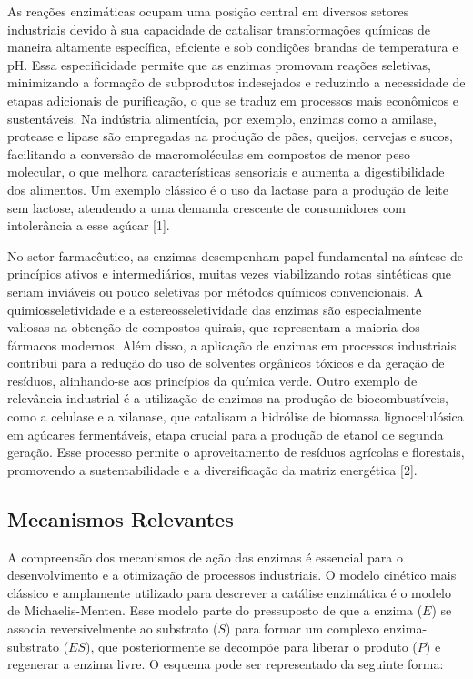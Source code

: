 \documentclass[12pt,oneside]{report}
\begin{document}
As reações enzimáticas ocupam uma posição central em diversos setores industriais devido à sua capacidade de catalisar transformações químicas de maneira altamente específica, eficiente e sob condições brandas de temperatura e pH. Essa especificidade permite que as enzimas promovam reações seletivas, minimizando a formação de subprodutos indesejados e reduzindo a necessidade de etapas adicionais de purificação, o que se traduz em processos mais econômicos e sustentáveis. Na indústria alimentícia, por exemplo, enzimas como a amilase, protease e lipase são empregadas na produção de pães, queijos, cervejas e sucos, facilitando a conversão de macromoléculas em compostos de menor peso molecular, o que melhora características sensoriais e aumenta a digestibilidade dos alimentos. Um exemplo clássico é o uso da lactase para a produção de leite sem lactose, atendendo a uma demanda crescente de consumidores com intolerância a esse açúcar [1].

No setor farmacêutico, as enzimas desempenham papel fundamental na síntese de princípios ativos e intermediários, muitas vezes viabilizando rotas sintéticas que seriam inviáveis ou pouco seletivas por métodos químicos convencionais. A quimiosseletividade e a estereosseletividade das enzimas são especialmente valiosas na obtenção de compostos quirais, que representam a maioria dos fármacos modernos. Além disso, a aplicação de enzimas em processos industriais contribui para a redução do uso de solventes orgânicos tóxicos e da geração de resíduos, alinhando-se aos princípios da química verde. Outro exemplo de relevância industrial é a utilização de enzimas na produção de biocombustíveis, como a celulase e a xilanase, que catalisam a hidrólise de biomassa lignocelulósica em açúcares fermentáveis, etapa crucial para a produção de etanol de segunda geração. Esse processo permite o aproveitamento de resíduos agrícolas e florestais, promovendo a sustentabilidade e a diversificação da matriz energética [2].

\subsection{Mecanismos Relevantes}

A compreensão dos mecanismos de ação das enzimas é essencial para o desenvolvimento e a otimização de processos industriais. O modelo cinético mais clássico e amplamente utilizado para descrever a catálise enzimática é o modelo de Michaelis-Menten. Esse modelo parte do pressuposto de que a enzima ($E$) se associa reversivelmente ao substrato ($S$) para formar um complexo enzima-substrato ($ES$), que posteriormente se decompõe para liberar o produto ($P$) e regenerar a enzima livre. O esquema pode ser representado da seguinte forma:
\end{document}
